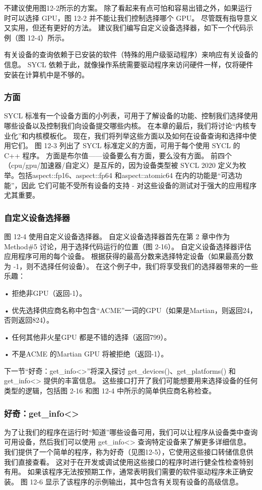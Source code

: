 不建议使用图12-2所示的方案。 除了看起来有点可怕和容易出错之外，如果运行时可以选择 GPU，图 12-2 并不能让我们控制选择哪个 GPU。 尽管既有指导意义又实用，但还有更好的方法。 建议我们编写自定义设备选择器，如下一个代码示例（图 12-4）所示。

有关设备的查询依赖于已安装的软件（特殊的用户级驱动程序）来响应有关设备的信息。 SYCL 依赖于此，就像操作系统需要驱动程序来访问硬件一样，仅将硬件安装在计算机中是不够的。

\subsubsection{方面}
SYCL 标准有一个设备方面的小列表，可用于了解设备的功能、控制我们选择使用哪些设备以及控制我们向设备提交哪些内核。 在本章的最后，我们将讨论“内核专业化”和内核模板化。 现在，我们将列举这些方面以及如何在设备查询和选择中使用它们。 图 12-3 列出了 SYCL 标准定义的方面，可用于每个使用 SYCL 的 C++ 程序。 方面是布尔值——设备要么有方面，要么没有方面。 前四个（cpu/gpu/加速器/自定义）是互斥的，因为设备类型被 SYCL 2020 定义为枚举。包括aspect::fp16、aspect::fp64 和aspect::atomic64 在内的功能是“可选功能”，因此 它们可能不受所有设备的支持 - 对这些设备的测试对于强大的应用程序尤其重要。

\subsubsection{自定义设备选择器}
图 12-4 使用自定义设备选择器。 自定义设备选择器首先在第 2 章中作为 Method\#5 讨论，用于选择代码运行的位置（图 2-16）。 自定义设备选择器评估应用程序可用的每个设备。 根据获得的最高分数来选择特定设备（如果最高分数为 -1，则不选择任何设备）。 在这个例子中，我们将享受我们的选择器带来的一些乐趣：

• 拒绝非GPU（返回-1）。

• 优先选择供应商名称中包含“ACME”一词的GPU（如果是Martian，则返回24，否则返回824）。

• 任何其他非火星GPU 都是不错的选择（返回799）。

• 不是ACME 的Martian GPU 将被拒绝（返回-1）。

下一节“好奇：get\_info<>”将深入探讨 get\_devices()、get\_platforms() 和 get\_info<> 提供的丰富信息。 这些接口打开了我们可能想要用来选择设备的任何类型的逻辑，包括图 2-16 和图 12-4 中所示的简单供应商名称检查。

\subsubsection{好奇：get\_info<>}
为了让我们的程序在运行时“知道”哪些设备可用，我们可以让程序从设备类中查询可用设备，然后我们可以使用 get\_info<> 查询特定设备来了解更多详细信息。 我们提供了一个简单的程序，称为好奇（见图12-5），它使用这些接口转储信息供我们直接查看。 这对于在开发或调试使用这些接口的程序时进行健全性检查特别有用。 如果该程序无法按预期工作，通常表明我们需要的软件驱动程序未正确安装。 图 12-6 显示了该程序的示例输出，其中包含有关现有设备的高级信息。

